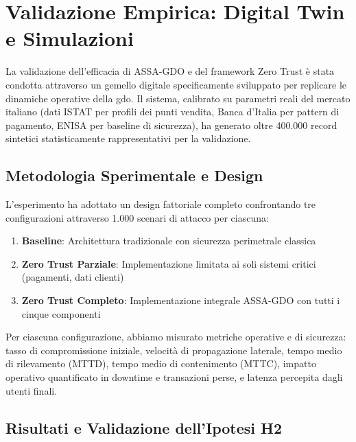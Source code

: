 \section{\texorpdfstring{Validazione Empirica: Digital Twin e Simulazioni}{2.6 - Validazione Empirica: Digital Twin e Simulazioni}}
\label{sec:validazione}

La validazione dell'efficacia di ASSA-GDO e del framework Zero Trust è stata condotta attraverso un gemello digitale specificamente sviluppato per replicare le dinamiche operative della \gls{gdo}. Il sistema, calibrato su parametri reali del mercato italiano (dati ISTAT per profili dei punti vendita, Banca d'Italia per pattern di pagamento, ENISA per baseline di sicurezza), ha generato oltre 400.000 record sintetici statisticamente rappresentativi per la validazione.

\subsection{\texorpdfstring{Metodologia Sperimentale e Design}{2.6.1 - Metodologia Sperimentale e Design}}

L'esperimento ha adottato un design fattoriale completo confrontando tre configurazioni attraverso 1.000 scenari di attacco per ciascuna:

\begin{enumerate}
\item \textbf{Baseline}: Architettura tradizionale con sicurezza perimetrale classica
\item \textbf{Zero Trust Parziale}: Implementazione limitata ai soli sistemi critici (pagamenti, dati clienti)
\item \textbf{Zero Trust Completo}: Implementazione integrale ASSA-GDO con tutti i cinque componenti
\end{enumerate}

Per ciascuna configurazione, abbiamo misurato metriche operative e di sicurezza: tasso di compromissione iniziale, velocità di propagazione laterale, tempo medio di rilevamento (MTTD), tempo medio di contenimento (MTTC), impatto operativo quantificato in downtime e transazioni perse, e latenza percepita dagli utenti finali.

\subsection{\texorpdfstring{Risultati e Validazione dell'Ipotesi H2}{2.6.2 - Risultati e Validazione dell'Ipotesi H2}}

